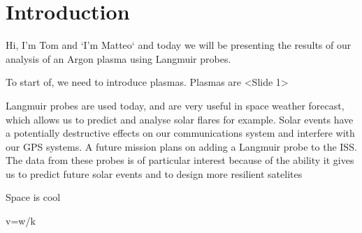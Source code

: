 \section{Introduction}




Hi, I'm Tom and `I'm Matteo` and today we will be presenting the results of our analysis of an Argon plasma using Langmuir probes.

To start of, we need to introduce plasmas. Plasmas are <Slide 1>

Langmuir probes are used today, and are very useful in space weather forecast, which allows us to predict and analyse solar flares for example. Solar events have a potentially destructive effects on our communications system and interfere with our GPS systems. A future mission plans on adding a Langmuir probe to the ISS. The data from these probes is of particular interest because of the ability it gives us to predict future solar events and to design more resilient satelites


Space is cool

v=w/k